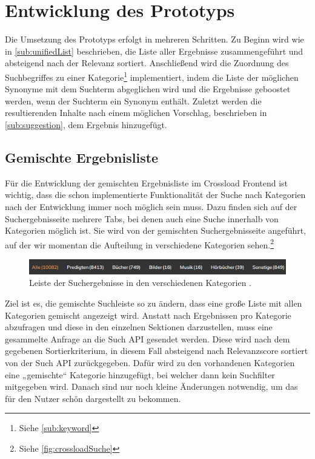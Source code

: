 \chapter{Entwicklung des Prototyps}
\label{ch:development}

Die Umsetzung des Prototyps erfolgt in mehreren Schritten.
Zu Beginn wird wie in \ref{sub:unifiedList} beschrieben, die Liste aller Ergebnisse zusammengeführt und absteigend nach der Relevanz sortiert.
Anschließend wird die Zuordnung des Suchbegriffes zu einer Kategorie\footnote{Siehe \ref{sub:keyword}} implementiert, indem die Liste der möglichen Synonyme mit dem Suchterm abgeglichen wird und die Ergebnisse geboostet werden, wenn der Suchterm ein Synonym enthält.
Zuletzt werden die resultierenden Inhalte nach einem möglichen Vorschlag, beschrieben in \ref{sub:suggestion}, dem Ergebnis hinzugefügt.

\section{Gemischte Ergebnisliste}
\label{sec:devUnifiedList}

Für die Entwicklung der gemischten Ergebnisliste im Crossload Frontend ist wichtig, dass die schon implementierte Funktionalität der Suche nach Kategorien nach der Entwicklung immer noch möglich sein muss.
Dazu finden sich auf der Suchergebnisseite mehrere Tabs, bei denen auch eine Suche innerhalb von Kategorien möglich ist.
Sie wird von der gemischten Suchergebnisseite angeführt, auf der wir momentan die Aufteilung in verschiedene Kategorien sehen.\footnote{Siehe \ref{fig:crossloadSuche}}

\begin{figure}[h]
  \begin{centering}
    \includegraphics[width=\textwidth]{figures/development/kategorienLeiste.png}
    \caption{Leiste der Suchergebnisse in den verschiedenen Kategorien \cite{pfleiderer2022}.}
    \label{fig:kategorienLeiste}
  \end{centering}
\end{figure}

Ziel ist es, die gemischte Suchleiste so zu ändern, dass eine große Liste mit allen Kategorien gemischt angezeigt wird.
Anstatt nach Ergebnissen pro Kategorie abzufragen und diese in den einzelnen Sektionen darzustellen, muss eine gesammelte Anfrage an die Such API gesendet werden.
Diese wird nach dem gegebenen Sortierkriterium, in diesem Fall absteigend nach Relevanzscore sortiert von der Such API zurückgegeben.
Dafür wird zu den vorhandenen Kategorien eine „gemischte“ Kategorie hinzugefügt, bei welcher dann kein Suchfilter mitgegeben wird.
Danach sind nur noch kleine Änderungen notwendig, um das für den Nutzer schön dargestellt zu bekommen.


